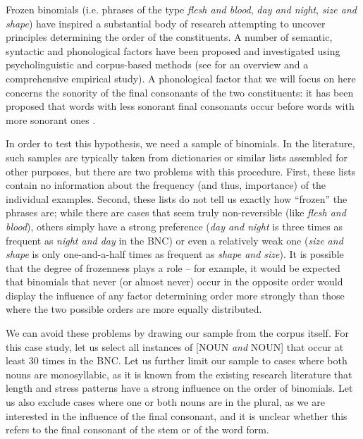 Frozen  binomials  (i.e. phrases of the type \textit{flesh and blood}, \textit{day and night}, \textit{size and shape}) have inspired a substantial body of research attempting to uncover principles determining the order of the constituents. A number of semantic,  syntactic  and phonological factors have been proposed and investigated using psycholinguistic  and corpus\hyp{}based methods (see \citet{lohmann_constituent_2013} for an overview and a comprehensive empirical study). A phonological factor that we will focus on here concerns the sonority  of the final consonants  of the two constituents: it has been proposed that words with less sonorant final consonants occur before words with more sonorant ones \citep[e.g.][]{cooper_word_1975}.

In order to test this hypothesis, we need a sample of binomials.  In the literature, such samples are typically taken from dictionaries  or similar lists assembled for other purposes, but there are two problems with this procedure. First, these lists contain no information about the frequency  (and thus, importance) of the individual examples. Second, these lists do not tell us exactly how ``frozen''  the phrases are; while there are cases that seem truly non\hyp{}reversible (like \textit{flesh and blood}), others simply have a strong preference (\textit{day and night} is three times as frequent as \textit{night and day} in the BNC)  or even a relatively weak one (\textit{size and shape} is only one\hyp{}and\hyp{}a-half times as frequent as \textit{shape and size}). It is possible that the degree of frozenness  plays a role -- for example, it would be expected that binomials  that never (or almost never) occur in the opposite order would display the influence of any factor determining order more strongly than those where the two possible orders are more equally  distributed.

We can avoid these problems by drawing our sample from the corpus itself. For this case study, let us select all instances of [NOUN \textit{and} NOUN]  that occur at least 30 times in the BNC.  Let us further limit our sample to cases where both nouns  are monosyllabic,  as it is known from the existing research literature that length  and stress patterns have a strong influence on the order of binomials.  Let us also exclude cases where one or both nouns are in the plural, as we are interested in the influence of the final consonant,  and it is unclear whether this refers to the final consonant of the stem  or of the word form.

